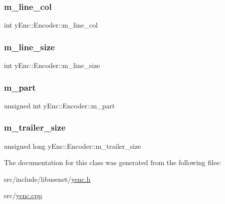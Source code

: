 \hypertarget{classy_enc_1_1_encoder_a15950c25554a3e60df426002f0a50432}{}\label{classy_enc_1_1_encoder_a15950c25554a3e60df426002f0a50432} 
\subsubsection{\texorpdfstring{m\+\_\+line\+\_\+col}{m\_line\_col}}
{\footnotesize\ttfamily int y\+Enc\+::\+Encoder\+::m\+\_\+line\+\_\+col\hspace{0.3cm}{\ttfamily [protected]}}

\hypertarget{classy_enc_1_1_encoder_ab5f35568fd44473fdeac30abe8f16c3e}{}\label{classy_enc_1_1_encoder_ab5f35568fd44473fdeac30abe8f16c3e} 
\subsubsection{\texorpdfstring{m\+\_\+line\+\_\+size}{m\_line\_size}}
{\footnotesize\ttfamily int y\+Enc\+::\+Encoder\+::m\+\_\+line\+\_\+size\hspace{0.3cm}{\ttfamily [protected]}}

\hypertarget{classy_enc_1_1_encoder_a63655714426e38492761ac313df01ae9}{}\label{classy_enc_1_1_encoder_a63655714426e38492761ac313df01ae9} 
\subsubsection{\texorpdfstring{m\+\_\+part}{m\_part}}
{\footnotesize\ttfamily unsigned int y\+Enc\+::\+Encoder\+::m\+\_\+part\hspace{0.3cm}{\ttfamily [protected]}}

\hypertarget{classy_enc_1_1_encoder_a16989cdea14ebcc4046b0a2ff815ac8d}{}\label{classy_enc_1_1_encoder_a16989cdea14ebcc4046b0a2ff815ac8d} 
\subsubsection{\texorpdfstring{m\+\_\+trailer\+\_\+size}{m\_trailer\_size}}
{\footnotesize\ttfamily unsigned long y\+Enc\+::\+Encoder\+::m\+\_\+trailer\+\_\+size\hspace{0.3cm}{\ttfamily [protected]}}



The documentation for this class was generated from the following files\+:\begin{DoxyCompactItemize}
\item 
src/include/libusenet/\hyperlink{yenc_8h}{yenc.\+h}\item 
src/\hyperlink{yenc_8cpp}{yenc.\+cpp}\end{DoxyCompactItemize}
